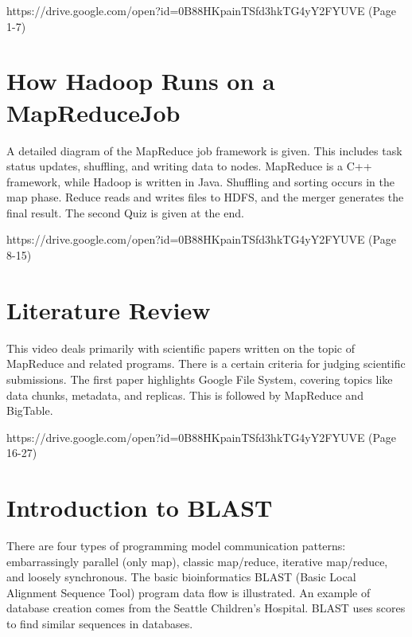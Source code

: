 
{https://drive.google.com/open?id=0B88HKpainTSfd3hkTG4yY2FYUVE
  (Page 1-7)}

\section{How Hadoop Runs on a MapReduceJob}

A detailed diagram of the MapReduce job framework is given. This
includes task status updates, shuffling, and writing data to nodes.
MapReduce is a C++ framework, while Hadoop is written in Java. Shuffling
and sorting occurs in the map phase. Reduce reads and writes files to
HDFS, and the merger generates the final result. The second Quiz is
given at the end.


{https://drive.google.com/open?id=0B88HKpainTSfd3hkTG4yY2FYUVE
  (Page 8-15)}

\section{Literature Review}

This video deals primarily with scientific papers written on the topic
of MapReduce and related programs. There is a certain criteria for
judging scientific submissions. The first paper highlights Google File
System, covering topics like data chunks, metadata, and replicas. This
is followed by MapReduce and BigTable.


{https://drive.google.com/open?id=0B88HKpainTSfd3hkTG4yY2FYUVE
  (Page 16-27)}

\section{Introduction to BLAST}

There are four types of programming model communication patterns:
embarrassingly parallel (only map), classic map/reduce, iterative
map/reduce, and loosely synchronous. The basic bioinformatics BLAST
(Basic Local Alignment Sequence Tool) program data flow is illustrated.
An example of database creation comes from the Seattle Children's
Hospital. BLAST uses scores to find similar sequences in databases.

